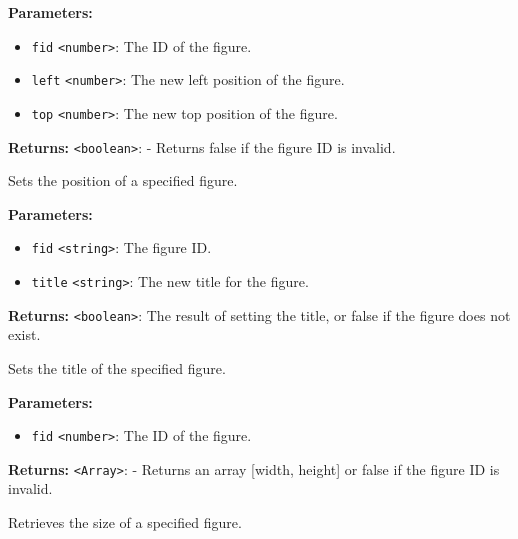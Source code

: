 \documentclass[12pt,a4paper]{article}
\begin{document}
\noindent \textbf{Parameters:}
\begin{itemize}
  \item \texttt{fid} \texttt{<number>}: The ID of the figure.
  \item \texttt{left} \texttt{<number>}: The new left position of the figure.
  \item \texttt{top} \texttt{<number>}: The new top position of the figure.
\end{itemize}

\noindent \textbf{Returns:} \texttt{<boolean>}: - Returns false if the figure ID is invalid.

\noindent Sets the position of a specified figure.

\vspace{5mm}
\noindent {}


\noindent \textbf{Parameters:}
\begin{itemize}
  \item \texttt{fid} \texttt{<string>}: The figure ID.
  \item \texttt{title} \texttt{<string>}: The new title for the figure.
\end{itemize}

\noindent \textbf{Returns:} \texttt{<boolean>}: The result of setting the title, or false if the figure does not exist.

\noindent Sets the title of the specified figure.

\vspace{5mm}
\noindent {}


\noindent \textbf{Parameters:}
\begin{itemize}
  \item \texttt{fid} \texttt{<number>}: The ID of the figure.
\end{itemize}

\noindent \textbf{Returns:} \texttt{<Array>}: - Returns an array [width, height] or false if the figure ID is invalid.

\noindent Retrieves the size of a specified figure.

\vspace{5mm}
\noindent {}
\end{document}
